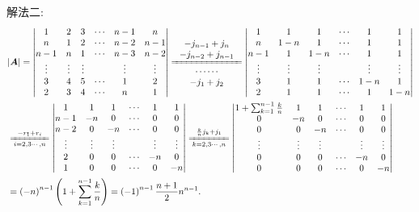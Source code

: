 \documentclass[../../main.tex]{subfiles}
\begin{document}
\begin{solution}
{\color{blue}解法二:}
\begin{align*}
&|\boldsymbol{A}|=\left| \begin{matrix}
1&		2&		3&		\cdots&		n-1&		n\\
n&		1&		2&		\cdots&		n-2&		n-1\\
n-1&		n&		1&		\cdots&		n-3&		n-2\\
\vdots&		\vdots&		\vdots&		&		\vdots&		\vdots\\
3&		4&		5&		\cdots&		1&		2\\
2&		3&		4&		\cdots&		n&		1\\
\end{matrix} \right|\xlongequal[\begin{array}{c}
\cdots \cdots\\
-j_1+j_2\\
\end{array}]{\begin{array}{c}
-j_{n-1}+j_n\\
-j_{n-2}+j_{n-1}\\
\end{array}}\left| \begin{matrix}
1&		1&		1&		\cdots&		1&		1\\
n&		1-n&		1&		\cdots&		1&		1\\
n-1&		1&		1-n&		\cdots&		1&		1\\
\vdots&		\vdots&		\vdots&		&		\vdots&		\vdots\\
3&		1&		1&		\cdots&		1-n&		1\\
2&		1&		1&		\cdots&		1&		1-n\\
\end{matrix} \right|
\\
&\xlongequal[i=2,3\cdots ,n]{-r_1+r_i}\left| \begin{matrix}
1&		1&		1&		\cdots&		1&		1\\
n-1&		-n&		0&		\cdots&		0&		0\\
n-2&		0&		-n&		\cdots&		0&		0\\
\vdots&		\vdots&		\vdots&		&		\vdots&		\vdots\\
2&		0&		0&		\cdots&		-n&		0\\
1&		0&		0&		\cdots&		0&		-n\\
\end{matrix} \right|\xlongequal[k=2,3\cdots ,n]{\frac{k}{n}j_k+j_1}\left| \begin{matrix}
1+\sum_{k=1}^{n-1}{\frac{k}{n}}&		1&		1&		\cdots&		1&		1\\
0&		-n&		0&		\cdots&		0&		0\\
0&		0&		-n&		\cdots&		0&		0\\
\vdots&		\vdots&		\vdots&		&		\vdots&		\vdots\\
0&		0&		0&		\cdots&		-n&		0\\
0&		0&		0&		\cdots&		0&		-n\\
\end{matrix} \right|
\\
&=\left( -n \right) ^{n-1}\left( 1+\sum_{k=1}^{n-1}{\frac{k}{n}} \right) =\left( -1 \right) ^{n-1}\frac{n+1}{2}n^{n-1}.
\end{align*}
\end{solution}
\end{document}
